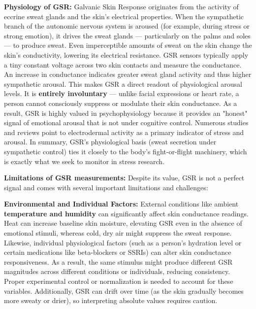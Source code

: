 \textbf{Physiology of GSR:} Galvanic Skin Response originates from the activity of eccrine sweat glands and the skin's electrical properties. When the sympathetic branch of the autonomic nervous system is aroused (for example, during stress or strong emotion), it drives the sweat glands — particularly on the palms and soles — to produce sweat\cite{ElectrodermalActivityWiki}. Even imperceptible amounts of sweat on the skin change the skin's conductivity, lowering its electrical resistance. GSR sensors typically apply a tiny constant voltage across two skin contacts and measure the conductance. An increase in conductance indicates greater sweat gland activity and thus higher sympathetic arousal\cite{GSRGuideIMotions}. This makes GSR a direct readout of physiological arousal levels. It is \textbf{entirely involuntary} — unlike facial expressions or heart rate, a person cannot consciously suppress or modulate their skin conductance. As a result, GSR is highly valued in psychophysiology because it provides an "honest" signal of emotional arousal that is not under cognitive control. Numerous studies and reviews point to electrodermal activity as a primary indicator of stress and arousal\cite{GSRPPGMachineLearning2024}. In summary, GSR's physiological basis (sweat secretion under sympathetic control) ties it closely to the body's fight-or-flight machinery, which is exactly what we seek to monitor in stress research.

\textbf{Limitations of GSR measurements:} Despite its value, GSR is not a perfect signal and comes with several important limitations and challenges\cite{ElectrodermalActivityWiki}:

\textbf{Environmental and Individual Factors:} External conditions like ambient \textbf{temperature and humidity} can significantly affect skin conductance readings\cite{ElectrodermalActivityWiki}. Heat can increase baseline skin moisture, elevating GSR even in the absence of emotional stimuli, whereas cold, dry air might suppress the sweat response. Likewise, individual physiological factors (such as a person's hydration level or certain medications like beta-blockers or SSRIs) can alter skin conductance responsiveness\cite{ElectrodermalActivityWiki}. As a result, the same stimulus might produce different GSR magnitudes across different conditions or individuals, reducing consistency. Proper experimental control or normalization is needed to account for these variables. Additionally, GSR can drift over time (as the skin gradually becomes more sweaty or drier), so interpreting absolute values requires caution.

